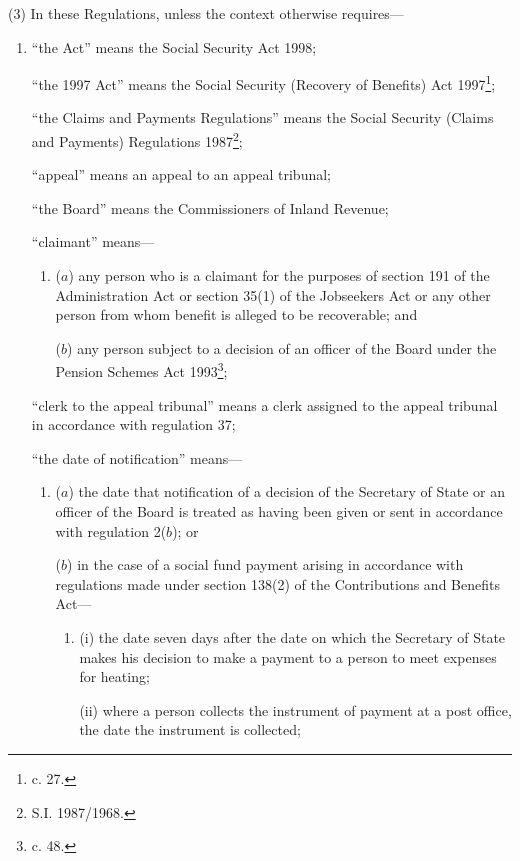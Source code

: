 \documentclass[12pt,a4paper]{article}
\begin{document}
(3) In these Regulations, unless the context otherwise requires—
\begin{enumerate}\item[]
“the Act” means the Social Security Act 1998;

“the 1997 Act” means the Social Security (Recovery of Benefits) Act 1997\footnote{ c. 27.};

“the Claims and Payments Regulations” means the Social Security (Claims and Payments) Regulations 1987\footnote{\frenchspacing S.I. 1987/1968.};

“appeal” means an appeal to an appeal tribunal;

“the Board” means the Commissioners of Inland Revenue;

“claimant” means—
\begin{enumerate}\item[]
($a$) any person who is a claimant for the purposes of section 191 of the Administration Act or section 35(1) of the Jobseekers Act or any other person from whom benefit is alleged to be recoverable; and

($b$) any person subject to a decision of 
an officer of the Board  %
under the Pension Schemes Act 1993\footnote{ c. 48.};
\end{enumerate}

“clerk to the appeal tribunal” means a clerk assigned to the appeal tribunal in accordance with regulation 37;

“the date of notification” means—
\begin{enumerate}\item[]
($a$) the date that notification of a decision of the Secretary of State 
or an officer of the Board  %
is treated as having been given or sent in accordance with regulation 2($b$); or

($b$) in the case of a social fund payment arising in accordance with regulations made under section 138(2) of the Contributions and Benefits Act—
\begin{enumerate}\item[]
(i) the date seven days after the date on which the Secretary of State makes his decision to make a payment to a person to meet expenses for heating;

(ii) where a person collects the instrument of payment at a post office, the date the instrument is collected;


\end{enumerate}
\end{enumerate}
\end{enumerate}
\end{document}

